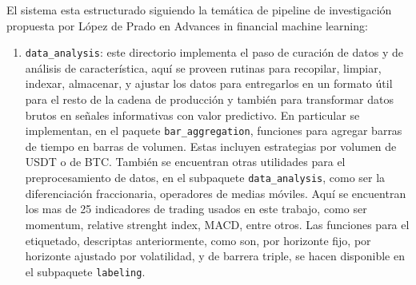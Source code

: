 El sistema esta estructurado siguiendo la temática de pipeline de investigación propuesta por López de Prado en Advances in financial machine learning:
\begin{enumerate}
\item \texttt{data\_analysis}: este directorio implementa el paso de curación de datos y de análisis de característica, aquí se proveen rutinas para recopilar, limpiar, indexar, almacenar, y ajustar los datos para entregarlos en un formato útil para el resto de la cadena de producción y también para transformar datos brutos en señales informativas con valor predictivo. En particular se implementan, en el paquete \texttt{bar\_aggregation},  funciones para agregar barras de tiempo en barras de volumen. Estas incluyen estrategias por volumen de USDT o de BTC. También se encuentran otras utilidades para el preprocesamiento de datos, en el subpaquete \texttt{data\_analysis}, como ser la diferenciación fraccionaria, operadores de medias móviles. Aquí se encuentran los mas de 25 indicadores de trading usados en este trabajo, como ser momentum, relative strenght index, MACD, entre otros. Las funciones para el etiquetado, descriptas anteriormente, como son, por horizonte fijo, por horizonte ajustado por volatilidad, y de barrera triple, se hacen disponible en el subpaquete \texttt{labeling}.


\end{enumerate}
